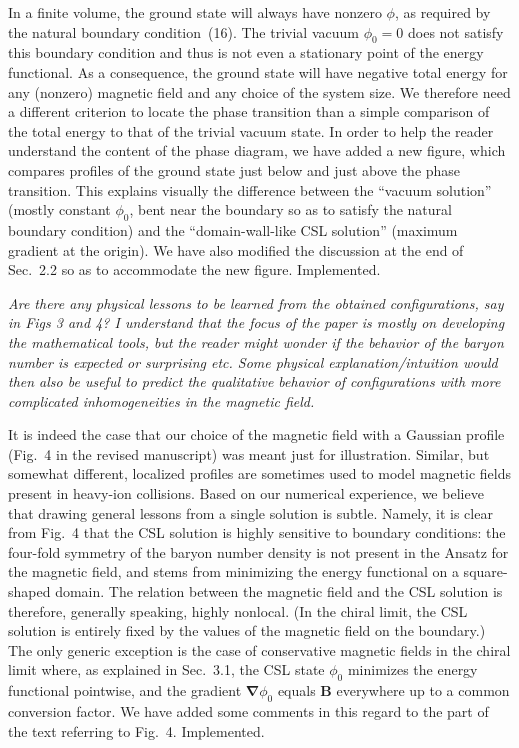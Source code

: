\documentclass[11pt,a4paper]{article}
\newcommand{\vek}[1]{\bm{#1}}
\newcommand{\grad}{\vek\nabla}
\newcommand{\impl}{\textcolor{green!60!black}{Implemented.}}
\newcommand{\referee}[1]{\medskip\noindent{\sffamily\large #1)~Referee:}\par\smallskip}
\newcommand{\reply}{\par\medskip\noindent{\sffamily\large Reply:}\par\smallskip\noindent}
\newenvironment{reftext}{\itshape}{\par}
\begin{document}
\reply
In a finite volume, the ground state will always have nonzero $\phi$, as required by the natural boundary condition~(16). The trivial vacuum $\phi_0=0$ does not satisfy this boundary condition and thus is not even a stationary point of the energy functional. As a consequence, the ground state will have negative total energy for any (nonzero) magnetic field and any choice of the system size. We therefore need a different criterion to locate the phase transition than a simple comparison of the total energy to that of the trivial vacuum state. In order to help the reader understand the content of the phase diagram, we have added a new figure, which compares profiles of the ground state just below and just above the phase transition. This explains visually the difference between the ``vacuum solution'' (mostly constant $\phi_0$, bent near the boundary so as to satisfy the natural boundary condition) and the ``domain-wall-like CSL solution'' (maximum gradient at the origin). We have also modified the discussion at the end of Sec.~2.2 so as to accommodate the new figure. \impl

\referee{3}
\begin{reftext}
Are there any physical lessons to be learned from the obtained configurations, say in Figs 3 and 4? I understand that the focus of the paper is mostly on developing the mathematical tools, but the reader might wonder if the behavior of the baryon number is expected or surprising etc. Some physical explanation/intuition would then also be useful to predict the qualitative behavior of configurations with more complicated inhomogeneities in the magnetic field.
\end{reftext}

\reply
It is indeed the case that our choice of the magnetic field with a Gaussian profile (Fig.~4 in the revised manuscript) was meant just for illustration. Similar, but somewhat different, localized profiles are sometimes used to model magnetic fields present in heavy-ion collisions. Based on our numerical experience, we believe that drawing general lessons from a single solution is subtle. Namely, it is clear from Fig.~4 that the CSL solution is highly sensitive to boundary conditions: the four-fold symmetry of the baryon number density is not present in the Ansatz for the magnetic field, and stems from minimizing the energy functional on a square-shaped domain. The relation between the magnetic field and the CSL solution is therefore, generally speaking, highly nonlocal. (In the chiral limit, the CSL solution is entirely fixed by the values of the magnetic field on the boundary.) The only generic exception is the case of conservative magnetic fields in the chiral limit where, as explained in Sec.~3.1, the CSL state $\phi_0$ minimizes the energy functional pointwise, and the gradient $\grad\phi_0$ equals $\vek B$ everywhere up to a common conversion factor. We have added some comments in this regard to the part of the text referring to Fig.~4. \impl
\end{document}
